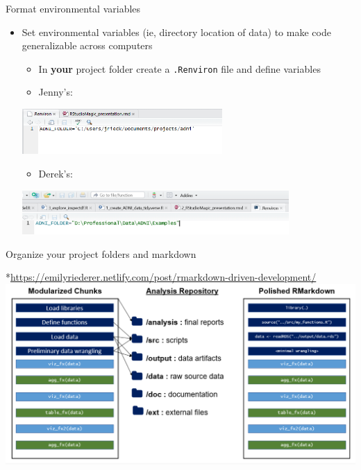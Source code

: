 \documentclass[
  ignorenonframetext,
]{beamer}
\providecommand{\tightlist}{%
  \setlength{\itemsep}{0pt}\setlength{\parskip}{0pt}}
\begin{document}
\begin{frame}[fragile]{Format environmental variables}
\protect\hypertarget{format-environmental-variables}{}

\begin{itemize}
\tightlist
\item
  Set environmental variables (ie, directory location of data) to make
  code generalizable across computers

  \begin{itemize}
  \tightlist
  \item
    In \textbf{your} project folder create a \texttt{.Renviron} file and
    define variables
  \item
    Jenny's:
  \end{itemize}

  \includegraphics[width=0.6\textwidth,height=\textheight]{../external/images/setup_3_rstudio_project_environ.PNG}

  \begin{itemize}
  \tightlist
  \item
    Derek's:
  \end{itemize}

  \includegraphics[width=0.8\textwidth,height=\textheight]{../external/images/setup_3_rstudio_project_environ2.PNG}
\end{itemize}

\end{frame}

\begin{frame}{Organize your project folders and markdown}
\protect\hypertarget{organize-your-project-folders-and-markdown}{}

*\url{https://emilyriederer.netlify.com/post/rmarkdown-driven-development/}
\includegraphics{../external/images/setup_4_markdown_project.PNG}

\end{frame}
\end{document}
